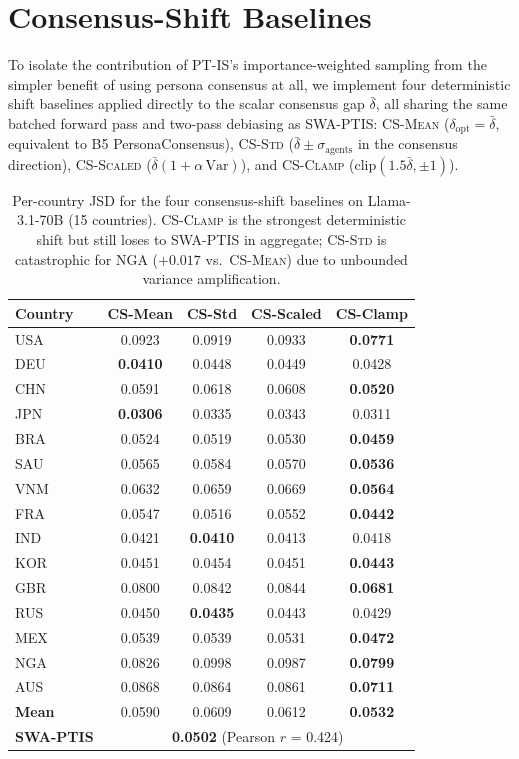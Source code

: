 \documentclass{article}
\begin{document}
\section{Consensus-Shift Baselines}
\label{app:cs_baseline}

To isolate the contribution of PT-IS's importance-weighted sampling from the
simpler benefit of using persona consensus at all, we implement four deterministic
shift baselines applied directly to the scalar consensus gap $\bar\delta$, all
sharing the same batched forward pass and two-pass debiasing as SWA-PTIS:
\textsc{CS-Mean} ($\delta_\text{opt}=\bar\delta$, equivalent to B5 PersonaConsensus),
\textsc{CS-Std} ($\bar\delta\pm\sigma_\text{agents}$ in the consensus direction),
\textsc{CS-Scaled} ($\bar\delta(1+\alpha\,\text{Var})$), and
\textsc{CS-Clamp} ($\text{clip}(1.5\bar\delta,\pm1)$).

\begin{table}[h]\centering\scriptsize
\caption{Per-country JSD for the four consensus-shift baselines on Llama-3.1-70B
(15 countries). \textsc{CS-Clamp} is the strongest deterministic shift but still
loses to SWA-PTIS in aggregate; \textsc{CS-Std} is catastrophic for NGA
($+0.017$ vs.\ \textsc{CS-Mean}) due to unbounded variance amplification.}
\label{tab:consensus_shift_country}
\begin{tabular}{lcccc}\toprule
Country & CS-Mean & CS-Std & CS-Scaled & CS-Clamp \\\midrule
USA & 0.0923 & 0.0919 & 0.0933 & \textbf{0.0771} \\
DEU & \textbf{0.0410} & 0.0448 & 0.0449 & 0.0428 \\
CHN & 0.0591 & 0.0618 & 0.0608 & \textbf{0.0520} \\
JPN & \textbf{0.0306} & 0.0335 & 0.0343 & 0.0311 \\
BRA & 0.0524 & 0.0519 & 0.0530 & \textbf{0.0459} \\
SAU & 0.0565 & 0.0584 & 0.0570 & \textbf{0.0536} \\
VNM & 0.0632 & 0.0659 & 0.0669 & \textbf{0.0564} \\
FRA & 0.0547 & 0.0516 & 0.0552 & \textbf{0.0442} \\
IND & 0.0421 & \textbf{0.0410} & 0.0413 & 0.0418 \\
KOR & 0.0451 & 0.0454 & 0.0451 & \textbf{0.0443} \\
GBR & 0.0800 & 0.0842 & 0.0844 & \textbf{0.0681} \\
RUS & 0.0450 & \textbf{0.0435} & 0.0443 & 0.0429 \\
MEX & 0.0539 & 0.0539 & 0.0531 & \textbf{0.0472} \\
NGA & 0.0826 & 0.0998 & 0.0987 & \textbf{0.0799} \\
AUS & 0.0868 & 0.0864 & 0.0861 & \textbf{0.0711} \\\midrule
\textbf{Mean} & 0.0590 & 0.0609 & 0.0612 & \textbf{0.0532} \\\midrule
\textbf{SWA-PTIS} & \multicolumn{4}{c}{\textbf{0.0502} (Pearson $r$ = 0.424)} \\\bottomrule
\end{tabular}
\end{table}
\end{document}
